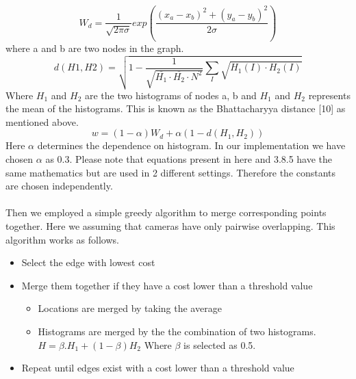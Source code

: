 \documentclass[12pt,a4paper]{report}
\begin{document}
\begin{equation}
\label{eqn:multicam1}
W_d = \frac{1}{\sqrt{2\pi \sigma }}exp\left (\frac{(x_a-x_b)^2+ (y_a-y_b)^2}{2\sigma }\right )
\end{equation}
where a and b are two nodes in the graph.
\begin{equation}
\label{eqn:multicam2}
d(H1,H2)=\sqrt{1-\frac{1}{\sqrt{\overline{H_1}\cdot \overline{H_2}\cdot N^2}}\sum_{I}^{ }\sqrt{H_1(I)\cdot H_2(I)}}
\end{equation}
Where $H_1$ and $H_2$ are the two histograms of nodes a, b and $H_1$ and $H_2$  represents the mean of the histograms. This is known as the Bhattacharyya distance [10] as mentioned above.
\begin{equation}
\label{eqn:multicam3}
w = (1-\alpha)W_d + \alpha(1-d(H_1,H_2))
\end{equation}
Here $\alpha$ determines the dependence on histogram. In our implementation we have chosen $\alpha$ as 0.3. Please note that equations present in here and 3.8.5 have the same mathematics but are used in 2 different settings. Therefore the constants are chosen independently.\\\\
Then we employed a simple greedy algorithm to merge corresponding points together. Here we assuming that cameras have only pairwise overlapping. This algorithm works as follows.
\begin{itemize}
\item Select the edge with lowest cost
\item Merge them together if they have a cost lower than a threshold value
\begin{itemize}
\item Locations are merged by taking the average
\item Histograms are merged by the the combination of two histograms.\\
$H = \beta. H_1 + (1- \beta)  H_2$ Where $\beta$ is selected as 0.5.

\end{itemize}
\item Repeat until edges exist with a cost lower than a threshold value
\end{itemize}
\end{document}
